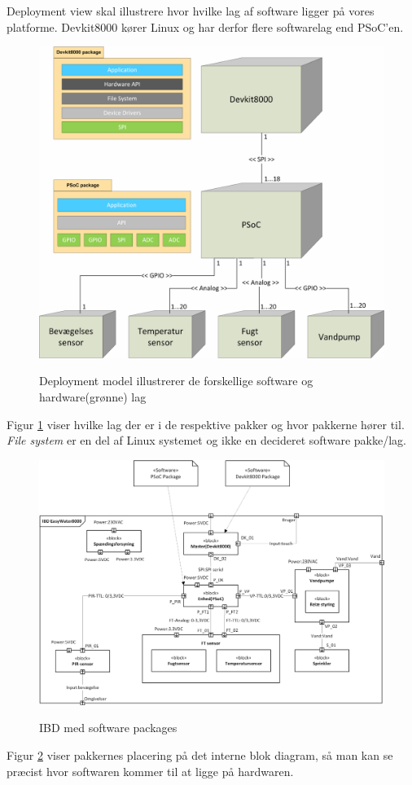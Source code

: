 
Deployment view skal illustrere hvor hvilke lag af software ligger på vores platforme. Devkit8000 kører Linux og har derfor flere softwarelag end PSoC'en.
 
\vspace{15 mm}

\begin{figure}[htbp] \centering
{\includegraphics[scale=0.7]{filer/systemarkitektur/Deployment_model}}
\caption{Deployment model illustrerer de forskellige software og hardware(grønne) lag}
\label{fig:Deployment Model}
\end{figure}

Figur \ref{fig:Deployment Model} viser hvilke lag der er i de respektive pakker og hvor pakkerne hører til. \textit{File system} er en del af Linux systemet og ikke en decideret software pakke/lag.

\clearpage

\begin{figure}[!htbp] \centering
{\includegraphics[scale=0.7]{filer/systemarkitektur/IBD_deployment}}
\caption{IBD med software packages}
\label{fig:IBD deployment}
\end{figure}

Figur \ref{fig:IBD deployment} viser pakkernes placering på det interne blok diagram, så man kan se præcist hvor softwaren kommer til at ligge på hardwaren.
